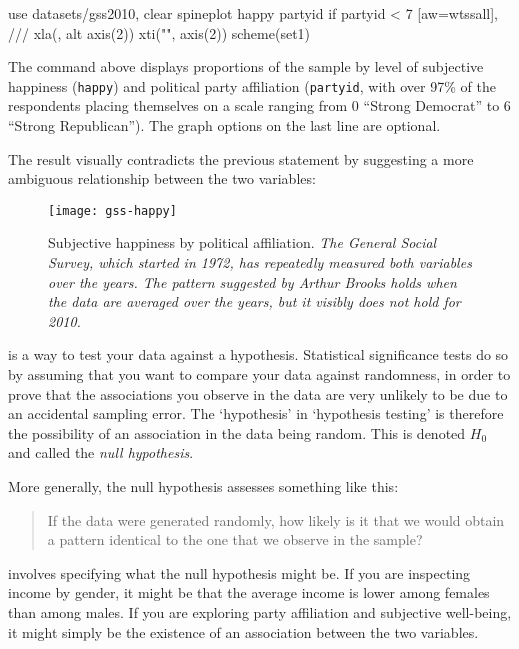 \begin{docspec}
use datasets/gss2010, clear
spineplot happy partyid if partyid < 7 [aw=wtssall], ///
    xla(, alt axis(2)) xti("", axis(2)) scheme(set1)
\end{docspec}

The  command above displays proportions of the sample by level of subjective happiness (\texttt{happy}) and political party affiliation (\texttt{partyid}, with over 97\% of the respondents placing themselves on a scale ranging from 0 ``Strong Democrat'' to 6 ``Strong Republican''). The graph options on the last line are optional.

The result visually contradicts the previous statement by suggesting a more ambiguous relationship between the two variables:

\begin{figure}
  \texttt{[image: gss-happy]}
  \caption[Subjective happiness by political affiliation.]%
  {Subjective happiness by political affiliation. %
  \emph{The General Social Survey, which started in 1972, has repeatedly measured both variables over the years. The pattern suggested by Arthur Brooks holds when the data are averaged over the years, but it visibly does not hold for 2010.}}%
  \label{fig:stata-window}
\end{figure}

 is a way to test your data against a hypothesis. Statistical significance tests do so by assuming that you want to compare your data against randomness, in order to prove that the associations you observe in the data are very unlikely to be due to an accidental sampling error. The `hypothesis' in `hypothesis testing' is therefore the possibility of an association in the data being random. This is denoted $H_0$ and called the \emph{null hypothesis}.

More generally, the null hypothesis assesses something like this:

\begin{quote}
If the data were generated randomly, how likely is it that we would obtain a pattern identical to the one that we observe in the sample?
\end{quote}

 involves specifying what the null hypothesis might be. If you are inspecting income by gender, it might be that the average income is lower among females than among males. If you are exploring party affiliation and subjective well-being, it might simply be the existence of an association between the two variables. 

